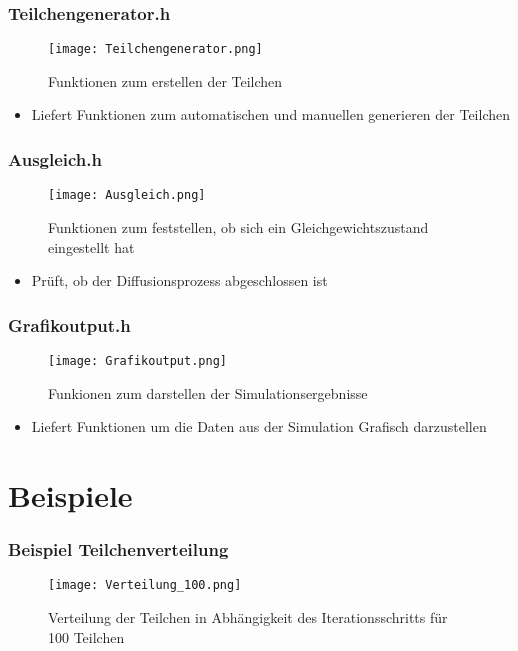 \documentclass{beamer}
\begin{document}
\begin{frame} %
  \frametitle{Teilchengenerator.h} %
  \begin{figure}
		\centering
		\texttt{[image: Teilchengenerator.png]}
		\caption{Funktionen zum erstellen der Teilchen}
  \end{figure}
  \begin{itemize}
  	\item Liefert Funktionen zum automatischen und manuellen generieren der Teilchen
  \end{itemize}
\end{frame}

\begin{frame} %
  \frametitle{Ausgleich.h} %
  \begin{figure}
		\centering
		\texttt{[image: Ausgleich.png]}
		\caption{Funktionen zum feststellen, ob sich ein Gleichgewichtszustand eingestellt hat}
  \end{figure}
  \begin{itemize}
  	\item Prüft, ob der Diffusionsprozess abgeschlossen ist
  \end{itemize}
\end{frame}

\begin{frame} %
  \frametitle{Grafikoutput.h} %
  \begin{figure}
		\centering
		\texttt{[image: Grafikoutput.png]}
		\caption{Funkionen zum darstellen der Simulationsergebnisse}
  \end{figure}
  \begin{itemize}
  	\item Liefert Funktionen um die Daten aus der Simulation Grafisch darzustellen
  \end{itemize}
\end{frame}

\section{Beispiele}

\begin{frame} %
  \frametitle{Beispiel Teilchenverteilung} %
  \begin{figure}
		\centering
		\texttt{[image: Verteilung\_100.png]}
		\caption{Verteilung der Teilchen in Abhängigkeit des Iterationsschritts für 100 Teilchen}
  \end{figure}
\end{frame}
\end{document}
